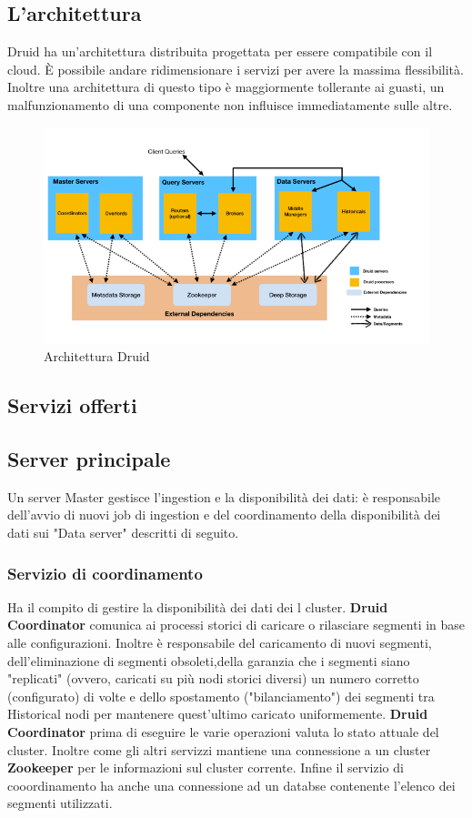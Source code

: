 \documentclass{article}
\begin{document}
\subsection{L'architettura}
Druid ha un'architettura distribuita progettata per essere compatibile con il cloud. È possibile andare ridimensionare i servizi per avere la massima flessibilità. Inoltre una architettura di questo tipo è maggiormente tollerante ai guasti, un malfunzionamento di una componente non influisce immediatamente sulle altre.
\begin{figure}[h]
    \centering
    \includegraphics[scale=0.5]{images/architettura_druid.png}
    \caption{Architettura Druid}
    \label{fig:my_label}
\end{figure}
\subsection{Servizi offerti}
\subsection{Server principale}
Un server Master gestisce l'ingestion e la disponibilità dei dati: è responsabile dell'avvio di nuovi job di ingestion e del coordinamento della disponibilità dei dati sui "Data server" descritti di seguito.
\subsubsection{Servizio di coordinamento}
Ha il compito di gestire la disponibilità dei dati dei l cluster.
\textbf{Druid Coordinator} comunica ai processi storici di caricare o rilasciare segmenti in base alle configurazioni.
Inoltre è responsabile del caricamento di nuovi segmenti, dell'eliminazione di segmenti obsoleti,della garanzia che i segmenti siano "replicati" (ovvero, caricati su più nodi storici diversi) un numero corretto (configurato) di volte e dello spostamento ("bilanciamento") dei segmenti tra Historical nodi per mantenere quest'ultimo caricato uniformemente.
\textbf{Druid Coordinator} prima di eseguire le varie operazioni valuta lo stato attuale del cluster. Inoltre come gli altri servizzi mantiene una connessione a un cluster \textbf{Zookeeper} per le informazioni sul cluster corrente. Infine il servizio di cooordinamento ha anche una connessione ad un databse contenente l'elenco dei segmenti utilizzati.
\end{document}
